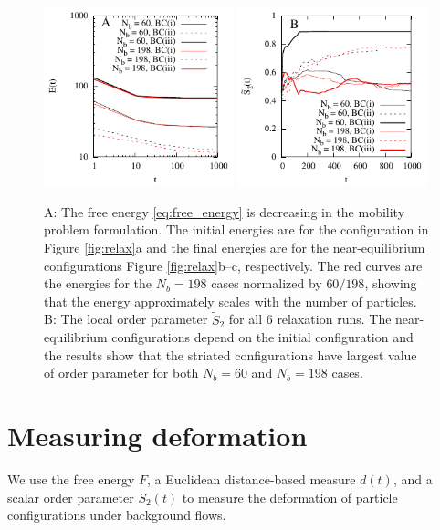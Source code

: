 \documentclass[aps,prl,preprint,groupedaddress]{revtex4-2}
\begin{document}
\begin{figure}
  \begin{center}
\includegraphics[width=0.49\textwidth]{relax_E.pdf}
\includegraphics[width=0.49\textwidth]{relax_LOP.pdf} 
  \end{center}
  \vspace{-20pt}  
  \caption{\label{fig:relax_energy}
  A:  The free energy \eqref{eq:free_energy} is decreasing
    in the mobility problem formulation.  The initial energies
    are for the configuration in Figure \ref{fig:relax}a
    and the final energies are for the near-equilibrium
    configurations Figure \ref{fig:relax}b--c, respectively. 
    The red curves are the energies for the $N_b = 198$ cases normalized
    by $60/198$, showing that the energy approximately scales with the number of
    particles. B: The local order parameter $\tilde{S}_2$ for all 6 relaxation runs. The near-equilibrium configurations depend on the initial configuration and the results show that 
    the striated configurations have largest value of order parameter for both $N_b=60$ and $N_b=198$ cases.
  }
\end{figure}

\section{Measuring deformation}
We use the free energy $F$,
a Euclidean distance-based measure $d(t)$,
and a scalar order parameter $S_{2}(t)$ to measure
the deformation of particle configurations under background flows. 
\end{document}
